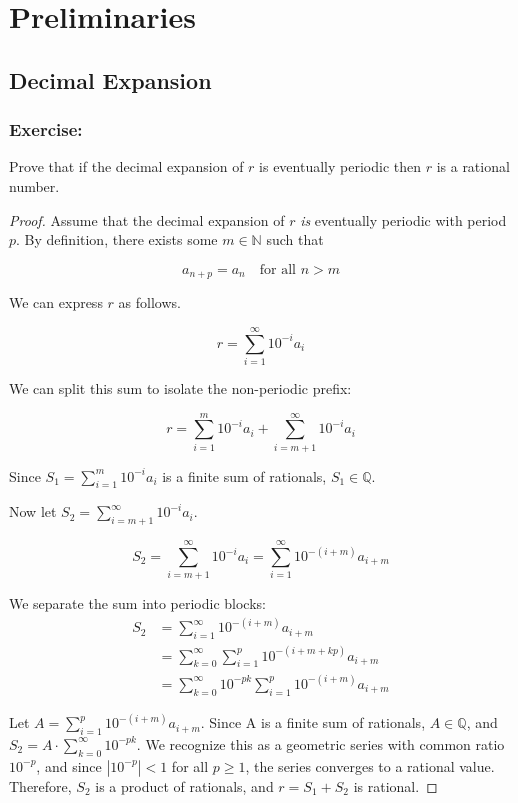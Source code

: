 \documentclass{amsart}
\begin{document}
    \section{Preliminaries}
    \subsection{Decimal Expansion}
    
    \subsubsection{Exercise:} Prove that if the decimal expansion of $r$ is eventually periodic then $r$ is a rational number.
    \begin{proof}
        Assume that the decimal expansion of $r$ \textit{is} eventually periodic with period $p$. By definition, there exists some $m \in \mathbb{N}$ such that

        \[a_{n+p} = a_n \quad \text{for all } n > m\]

        We can express $r$ as follows.

        \[ r = \sum_{i = 1}^{\infty} 10^{-i} a_i\] 

        We can split this sum to isolate the non-periodic prefix:

        \[ r = \sum_{i = 1}^{m} 10^{-i} a_i + \sum_{i = m + 1}^{\infty} 10^{-i} a_i \] 

        Since $S_1 = \sum_{i = 1}^{m} 10^{-i} a_i$ is a finite sum of rationals, $S_1 \in \mathbb{Q}$.

        Now let $S_2 = \sum_{i = m+1}^{\infty} 10^{-i} a_i$. 
        
        \[S_2 = \sum_{i = m+1}^{\infty} 10^{-i} a_i = \sum_{i = 1}^{\infty} 10^{-(i + m)} a_{i + m}\]

        We separate the sum into periodic blocks:
        \begin{align*}
            S_2 &= \sum_{i = 1}^{\infty} 10^{-(i + m)} a_{i + m} \\
            &= \sum_{k = 0}^{\infty} \sum_{i = 1}^{p} 10^{-(i + m + kp)} a_{i + m} \\
            &= \sum_{k = 0}^{\infty} 10^{-pk} \sum_{i = 1}^{p} 10^{-(i + m)} a_{i + m}
        \end{align*}
        
        Let $A = \sum_{i = 1}^{p} 10^{-(i + m)} a_{i + m}$. Since A is a finite sum of rationals, $A \in \mathbb{Q}$, and $S_2 = A \cdot \sum_{k = 0}^{\infty} 10^{-pk}.$ We recognize this as a geometric series with common ratio $10^{-p}$, and since $|10^{-p}| < 1$ for all $p \geq 1$, the series converges to a rational value. Therefore, $S_2$ is a product of rationals, and $r = S_1 + S_2$ is rational.
    \end{proof}
    \newpage
\end{document}
